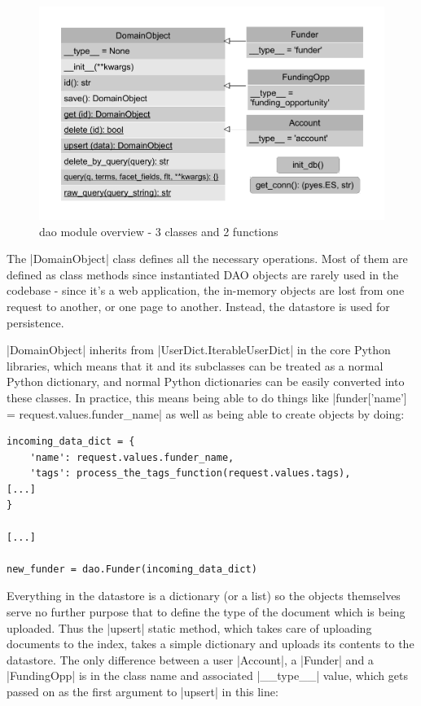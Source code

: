 \begin{figure}[H]
\centering
\includegraphics[width=1.00\textwidth,]{Chapter3/dao.pdf}
\caption{dao module overview - 3 classes and 2 functions}
\label{fig:dao}
\end{figure}

The |DomainObject| class defines all the necessary operations. Most of them are defined as class methods since instantiated DAO objects are rarely used in the codebase - since it's a web application, the in-memory objects are lost from one request to another, or one page to another. Instead, the datastore is used for persistence.

|DomainObject| inherits from |UserDict.IterableUserDict| in the core Python libraries, which means that it and its subclasses can be treated as a normal Python dictionary, and normal Python dictionaries can be easily converted into these classes. In practice, this means being able to do things like |funder['name'] = request.values.funder_name| as well as being able to create objects by doing:

\begin{verbatim}
incoming_data_dict = {
    'name': request.values.funder_name,
    'tags': process_the_tags_function(request.values.tags),
[...]
}

[...]

new_funder = dao.Funder(incoming_data_dict)
\end{verbatim}

Everything in the datastore is a dictionary (or a list) so the objects themselves serve no further purpose that to define the type of the document which is being uploaded. Thus the |upsert| static method, which takes care of uploading documents to the index, takes a simple dictionary and uploads its contents to the datastore. The only difference between a user |Account|, a |Funder| and a |FundingOpp| is in the class name and associated |__type__| value, which gets passed on as the first argument to |upsert| in this line:

